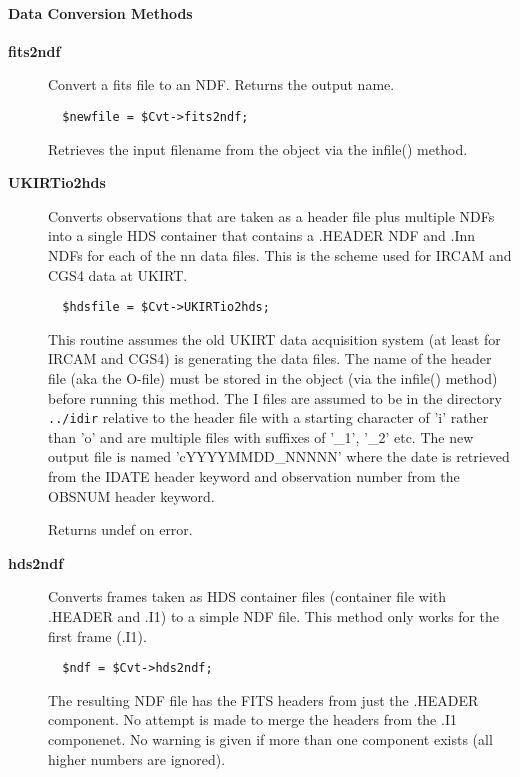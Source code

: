\paragraph*{Data Conversion Methods\label{ORAC::Convert_Data_Conversion_Methods}}\begin{description}
\item[\textbf{fits2ndf}] \mbox{}

Convert a fits file to an NDF.
Returns the output name.

\begin{verbatim}
  $newfile = $Cvt->fits2ndf;
\end{verbatim}


Retrieves the input filename from the object via the infile()
method.

\item[\textbf{UKIRTio2hds}] \mbox{}

Converts observations that are taken as a header file plus multiple
NDFs into a single HDS container that contains a .HEADER NDF and
.Inn NDFs for each of the nn data files. This is the scheme used for
IRCAM and CGS4 data at UKIRT.

\begin{verbatim}
  $hdsfile = $Cvt->UKIRTio2hds;
\end{verbatim}


This routine assumes the old UKIRT data acquisition system (at least for
IRCAM and CGS4) is generating the data files. The name of the header
file (aka the O-file) must be stored in the object (via the infile()
method) before running this method. The I files are assumed to be in
the directory \texttt{../idir} relative to the header file with a starting
character of 'i' rather than 'o' and are multiple files with
suffixes of '\_1', '\_2' etc. The new output file
is named 'cYYYYMMDD\_NNNNN' where the date is retrieved from the IDATE header
keyword and observation number from the OBSNUM header keyword.



Returns undef on error.

\item[\textbf{hds2ndf}] \mbox{}

Converts frames taken as HDS container files (container file with
.HEADER and .I1) to a simple NDF file. This method only works
for the first frame (.I1).

\begin{verbatim}
  $ndf = $Cvt->hds2ndf;
\end{verbatim}


The resulting NDF file has the FITS headers from just the .HEADER
component. No attempt is made to merge the headers from the .I1
componenet. No warning is given if more than one component exists (all
higher numbers are ignored).

\end{description}
